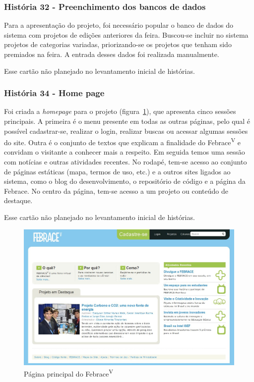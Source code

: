     \subsubsection{História 32 - Preenchimento dos bancos de dados}
      Para a apresentação do projeto, foi necessário popular o banco de dados do sistema com projetos de edições anteriores da feira. Buscou-se incluir no sistema projetos de categorias variadas, priorizando-se os projetos que tenham sido premiados na feira. A entrada desses dados foi realizada manualmente.

  Esse cartão não planejado no levantamento inicial de histórias.

    \subsubsection{História 34 - Home page}
      Foi criada a \textit{homepage} para o projeto (figura~\ref{homepage}), que apresenta cinco sessões principais. A primeira é o menu presente em todas as outras páginas, pelo qual é possível cadastrar-se, realizar o login, realizar buscas ou acessar algumas sessões do site. Outra é o conjunto de textos que explicam a finalidade do Febrace\textsuperscript{V} e convidam o visitante a conhecer mais a respeito. Em seguida temos uma sessão com notícias e outras atividades recentes. No rodapé, tem-se acesso ao conjunto de páginas estáticas (mapa, termos de uso, etc.) e a outros sites ligados ao sistema, como o blog do desenvolvimento, o repositório de código e a página da Febrace. No centro da página, tem-se acesso a um projeto ou conteúdo de destaque.

  Esse cartão não planejado no levantamento inicial de histórias.

    \begin{figure}
        \begin{center}
    \includegraphics[width=0.7\linewidth]{arquivos/home.png}
        \end{center}
        \caption{Página principal do Febrace\textsuperscript{V}}
        \label{homepage}
    \end{figure}

